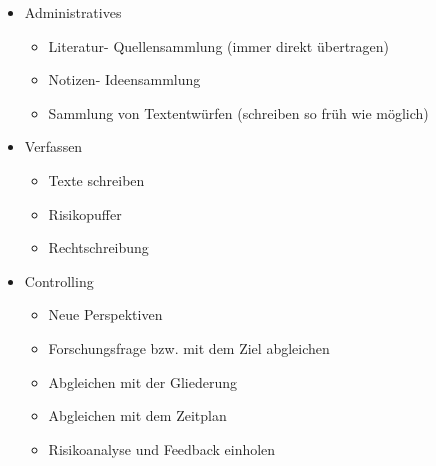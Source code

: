 \begin{itemize}
\item Administratives
\begin{itemize}
\item Literatur- Quellensammlung (immer direkt übertragen)
\item Notizen- Ideensammlung
\item Sammlung von Textentwürfen (schreiben so früh wie möglich)
\end{itemize}
\end{itemize}

\begin{itemize}
\item Verfassen
\begin{itemize}
\item Texte schreiben
\item Risikopuffer
\item Rechtschreibung
\end{itemize}
\end{itemize}

\begin{itemize}
\item Controlling
\begin{itemize}
\item Neue Perspektiven
\item Forschungsfrage bzw. mit dem Ziel abgleichen
\item Abgleichen mit der Gliederung
\item Abgleichen mit dem Zeitplan
\item Risikoanalyse und Feedback einholen
\end{itemize}
\end{itemize}





